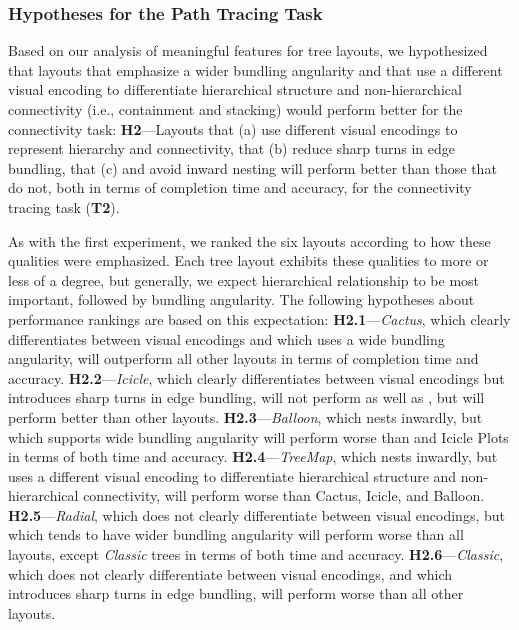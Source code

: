 \documentclass[a4paper]{llncs}
\begin{document}
\subsubsection{Hypotheses for the Path Tracing Task}
Based on our analysis of meaningful features for tree layouts, we hypothesized that layouts that emphasize a wider bundling angularity and that use a different visual encoding to differentiate hierarchical structure and non-hierarchical connectivity (i.e., containment and stacking) would perform better for the connectivity task: \textbf{H2}---Layouts that (a) use different visual encodings to represent hierarchy and connectivity, that (b) reduce sharp turns in edge bundling, that (c) and avoid inward nesting will perform better than those that do not, both in terms of completion time and accuracy, for the connectivity tracing task (\textbf{T2}). 

As with the first experiment, we ranked the six layouts according to how these qualities were emphasized. Each tree layout exhibits these qualities to more or less of a degree, but generally, we expect hierarchical relationship to be most important, followed by bundling angularity. The following hypotheses about performance rankings are based on this expectation: \textbf{H2.1}---\textit{Cactus}, which clearly differentiates between visual encodings and which uses a wide bundling angularity, will outperform all other layouts in terms of completion time and accuracy.
\noindent\textbf{H2.2}---\textit{Icicle}, which clearly differentiates between visual encodings but introduces sharp turns in edge bundling, will not perform as well as \theName{}, but will perform better than other layouts.
\noindent\textbf{H2.3}---\textit{Balloon}, which nests inwardly, but which supports wide bundling angularity  will perform worse than \theName{} and Icicle Plots in terms of both time and accuracy.
\noindent\textbf{H2.4}---\textit{TreeMap}, which nests inwardly, but uses a different visual encoding to differentiate hierarchical structure and non-hierarchical connectivity, will perform worse than Cactus, Icicle, and Balloon. 
\noindent\textbf{H2.5}---\textit{Radial}, which does not clearly differentiate between visual encodings, but which tends to have wider bundling angularity will perform worse than all layouts, except \textit{Classic} trees in terms of both time and accuracy.
\noindent\textbf{H2.6}---\textit{Classic}, which does not clearly differentiate between visual encodings, and which introduces sharp turns in edge bundling, will perform worse than all other layouts.
\end{document}
